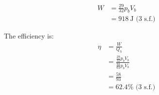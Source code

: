 \begin{solution}
\begin{subsolution}
        \begin{align*}
            W&=\frac{29}{32}p_b V_b\\
            &=\boxed{\qty{918}{\J}}\text{ (3 s.f.)}
        \end{align*}
    \end{subsolution}
    \begin{subsolution}
        The efficiency is:
        \begin{align*}
            \eta&=\frac{W}{Q_h}\\
            &=\frac{\frac{29}{32}p_b V_b}{\frac{93}{64}p_b V_b}\\
            &=\frac{58}{93}\\
            &=\boxed{62.4\%}\text{ (3 s.f.)}
        \end{align*}
    \end{subsolution}
\end{solution}
\newpage
